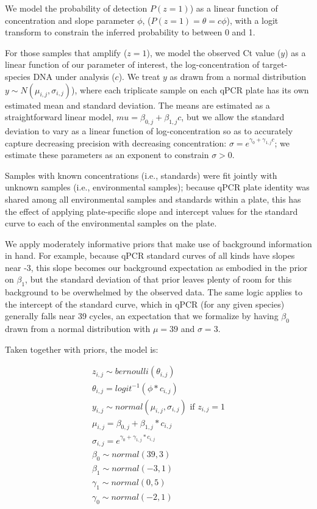 \documentclass[
]{article}
\begin{document}
We model the probability of detection \(P(z = 1)\)) as a linear function
of concentration and slope parameter \(\phi\),
(\(P(z = 1) = \theta = c\phi\)), with a logit transform to constrain the
inferred probability to between 0 and 1.

For those samples that amplify (\(z = 1\)), we model the observed Ct
value (\(y\)) as a linear function of our parameter of interest, the
log-concentration of target-species DNA under analysis (\(c\)). We treat
\(y\) as drawn from a normal distribution
\(y \sim N(\mu_{i,j}, \sigma_{i,j})\)), where each triplicate sample on
each qPCR plate has its own estimated mean and standard deviation. The
means are estimated as a straightforward linear model,
\(mu = \beta_{0,j} + \beta_{1,j}c\), but we allow the standard deviation
to vary as a linear function of log-concentration so as to accurately
capture decreasing precision with decreasing concentration:
\(\sigma = e^{\gamma_{0} + \gamma_{1,j}c}\); we estimate these
parameters as an exponent to constrain \(\sigma > 0\).

Samples with known concentrations (i.e., standards) were fit jointly
with unknown samples (i.e., environmental samples); because qPCR plate
identity was shared among all environmental samples and standards within
a plate, this has the effect of applying plate-specific slope and
intercept values for the standard curve to each of the environmental
samples on the plate.

We apply moderately informative priors that make use of background
information in hand. For example, because qPCR standard curves of all
kinds have slopes near -3, this slope becomes our background expectation
as embodied in the prior on \(\beta_1\), but the standard deviation of
that prior leaves plenty of room for this background to be overwhelmed
by the observed data. The same logic applies to the intercept of the
standard curve, which in qPCR (for any given species) generally falls
near 39 cycles, an expectation that we formalize by having \(\beta_0\)
drawn from a normal distribution with \(\mu = 39\) and \(\sigma = 3\).

Taken together with priors, the model is:

\begin{gather*}
z_{i,j} \sim bernoulli(\theta_{i,j}) \\
\theta_{i,j} = logit^{-1}(\phi*c_{i,j}) \\[4mm]
y_{i,j} \sim normal(\mu_{i,j}, \sigma_{i,j})   \text{    if } z_{i,j} = 1 \\
\mu_{i,j} = \beta_{0,j} + \beta_{1,j} * c_{i,j} \\
\sigma_{i,j} = e^{\gamma_{0}  + \gamma_{1,j}*c_{i,j}} \\[4mm]
\beta_{0} \sim normal(39, 3) \\
\beta_{1} \sim normal(-3, 1) \\
\gamma_{1} \sim normal(0,5) \\
\gamma_{0} \sim normal(-2,1)
\end{gather*}
\end{document}
